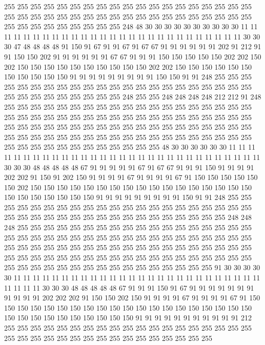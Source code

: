 255 255 255 255 255 255 255 255 255 255 255 255 255 255 255 255 255 255 255 255
255 255 255 255 255 255 255 255 255 255 255 255 255 255 255 255 255 255 255 255
255 255 255 255 255 255 255 248 48 30 30 30 30 30 30 30 30 30 30 11
11 11 11 11 11 11 11 11 11 11 11 11 11 11 11 11 11 11 11 11
11 11 11 11 11 11 30 30 30 47 48 48 48 48 91 150 91 67 91 91
67 91 67 67 91 91 91 91 91 91 202 91 212 91 91 150 150 202 91 91
91 91 91 91 67 67 91 91 91 150 150 150 150 150 202 202 150 202 150 150
150 150 150 150 150 150 150 150 202 202 150 150 150 150 150 150 150 150 150 150
150 91 91 91 91 91 91 91 91 91 150 150 91 91 248 255 255 255 255 255
255 255 255 255 255 255 255 255 255 255 255 255 255 255 255 255 255 255 255 255
255 255 255 255 255 255 248 255 255 248 248 248 248 212 212 91 248 255 255 255
255 255 255 255 255 255 255 255 255 255 255 255 255 255 255 255 255 255 255 255
255 255 255 255 255 255 255 255 255 255 255 255 255 255 255 255 255 255 255 255
255 255 255 255 255 255 255 255 255 255 255 255 255 255 255 255 255 255 255 255
255 255 255 255 255 255 255 255 255 255 255 255 255 255 255 255 255 255 255 255
255 255 255 255 255 48 30 30 30 30 30 30 11 11 11 11 11 11 11 11
11 11 11 11 11 11 11 11 11 11 11 11 11 11 11 11 11 11 11 11
11 11 30 30 30 48 48 48 48 48 67 91 91 91 91 91 67 91 67 67
91 91 91 150 91 91 91 91 202 202 91 150 91 202 150 91 91 91 91 67
91 91 91 91 67 91 150 150 150 150 150 150 202 150 150 150 150 150 150 150
150 150 150 150 150 150 150 150 150 150 150 150 150 150 150 150 150 91 91 91
91 91 91 91 91 91 150 91 91 248 255 255 255 255 255 255 255 255 255 255
255 255 255 255 255 255 255 255 255 255 255 255 255 255 255 255 255 255 255 255
255 255 255 255 255 255 255 255 248 248 248 255 255 255 255 255 255 255 255 255
255 255 255 255 255 255 255 255 255 255 255 255 255 255 255 255 255 255 255 255
255 255 255 255 255 255 255 255 255 255 255 255 255 255 255 255 255 255 255 255
255 255 255 255 255 255 255 255 255 255 255 255 255 255 255 255 255 255 255 255
255 255 255 255 255 255 255 255 255 255 255 255 255 255 255 255 255 255 255 255
255 255 91 30 30 30 30 30 11 11 11 11 11 11 11 11 11 11 11 11
11 11 11 11 11 11 11 11 11 11 11 11 11 11 11 11 11 11 30 30
30 48 48 48 48 48 67 91 91 91 150 91 67 91 91 91 91 91 91 91
91 91 91 91 202 202 202 91 150 150 202 150 91 91 91 91 67 91 91 91
91 67 91 150 150 150 150 150 150 150 150 150 150 150 150 150 150 150 150 150
150 150 150 150 150 150 150 150 150 150 150 150 150 91 91 91 91 91 91 91
91 91 91 91 212 255 255 255 255 255 255 255 255 255 255 255 255 255 255 255
255 255 255 255 255 255 255 255 255 255 255 255 255 255 255 255 255 255 255 255
